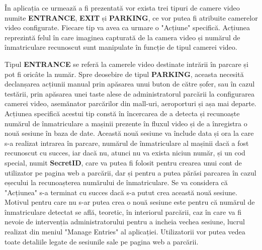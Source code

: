 \documentclass[12pt]{article}
\begin{document}
\^{I}n aplicația ce urmeaz\u{a} a fi prezentat\u{a} vor exista trei tipuri de camere video numite \textbf{ENTRANCE}, \textbf{EXIT} și \textbf{PARKING}, ce vor putea fi atribuite camerelor video configurate. Fiecare tip va avea ca urmare o "Acțiune" specific\u{a}. Acțiunea reprezint\u{a} felul \^{i}n care imaginea capturat\u{a} de la camera video și num\u{a}rul de \^{i}nmatriculare recunoscut sunt manipulate \^{i}n funcție de tipul camerei video.

Tipul \textbf{ENTRANCE} se refer\u{a} la camerele video destinate intr\u{a}rii \^{i}n parcare și pot fi oric\^{a}te la num\u{a}r. Spre deosebire de tipul \textbf{PARKING}, aceasta necesit\u{a} declanșarea acțiunii manual prin ap\u{a}sarea unui buton de c\u{a}tre șofer, sau \^{i}n cazul test\u{a}rii, prin ap\u{a}sarea unei taste alese de administratorul parc\u{a}rii la configurarea camerei video, asem\u{a}nator parc\u{a}rilor din mall-uri, aeroporturi și așa mai departe. Acțiunea specific\u{a} acestui tip const\u{a} \^{i}n \^{i}ncercarea de a detecta și recunoaște num\u{a}rul de \^{i}nmatriculare a mașinii prezente \^{i}n fluxul video și de a \^{i}nregistra o nou\u{a} sesiune \^{i}n baza de date. Aceast\u{a} nou\u{a} sesiune va \^{i}nclude data și ora la care s-a realizat intrarea \^{i}n parcare, num\u{a}rul de \^{i}nmatriculare al mașinii dac\u{a} a fost recunoscut cu succes, iar dac\u{a} nu, atunci nu va exista niciun num\u{a}r, și un cod special, numit \textbf{SecretID}, care va putea fi folosit pentru crearea unui cont de utilizator pe pagina web a parc\u{a}rii, dar și pentru a putea p\u{a}r\u{a}si parcarea \^{i}n cazul eșecului la recunoașterea num\u{a}rului de \^{i}nmatriculare. Se va considera c\u{a} "Acțiunea" s-a terminat cu succes dac\u{a} s-a putut crea aceast\u{a} nou\u{a} sesiune. Motivul pentru care nu s-ar putea crea o nou\u{a} sesiune este pentru c\u{a} num\u{a}rul de \^{i}nmatriculare detectat se afl\u{a}, teoretic, \^{i}n interiorul parc\u{a}rii, caz \^{i}n care va fi nevoie de intervenția administratorului pentru a incheia vechea sesiune, lucrul realizat din meniul "Manage Entries" al aplicației. Utilizatorii vor putea vedea toate detaliile legate de sesiunile sale pe pagina web a parc\u{a}rii.
\end{document}
